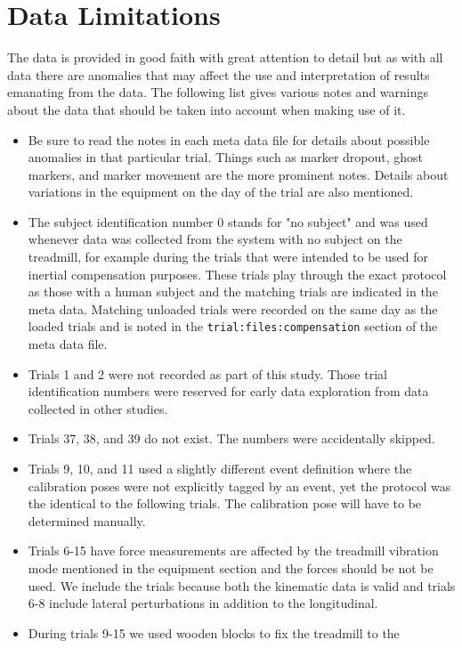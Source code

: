 \documentclass[fleqn,10pt]{wlpeerj}
\begin{document}
\section*{Data Limitations}
%
The data is provided in good faith with great attention to detail but as with
all data there are anomalies that may affect the use and interpretation of
results emanating from the data. The following list gives various notes and
warnings about the data that should be taken into account when making use of
it.
%
\begin{itemize}
  \item Be sure to read the notes in each meta data file for details about
    possible anomalies in that particular trial. Things such as marker dropout,
    ghost markers, and marker movement are the more prominent notes. Details
    about variations in the equipment on the day of the trial are also
    mentioned.
  \item The subject identification number 0 stands for "no subject" and was
    used whenever data was collected from the system with no subject on the
    treadmill, for example during the trials that were intended to be used for
    inertial compensation purposes. These trials play through the exact
    protocol as those with a human subject and the matching trials are
    indicated in the meta data. Matching unloaded trials were recorded on the
    same day as the loaded trials and is noted in the
    \verb|trial:files:compensation| section of the meta data file.
  \item Trials 1 and 2 were not recorded as part of this study. Those trial
    identification numbers were reserved for early data exploration from data
    collected in other studies.
  \item Trials 37, 38, and 39 do not exist. The numbers were accidentally
    skipped.
  \item Trials 9, 10, and 11 used a slightly different event definition where the
    calibration poses were not explicitly tagged by an event, yet the protocol
    was the identical to the following trials. The calibration pose will have
    to be determined manually.
  \item  Trials 6-15 have force measurements are affected by the treadmill
    vibration mode mentioned in the equipment section and the forces should be
    not be used. We include the trials because both the kinematic data is valid
    and trials 6-8 include lateral perturbations in addition to the
    longitudinal.
  \item During trials 9-15 we used wooden blocks to fix the treadmill to the

\end{itemize}
\end{document}
